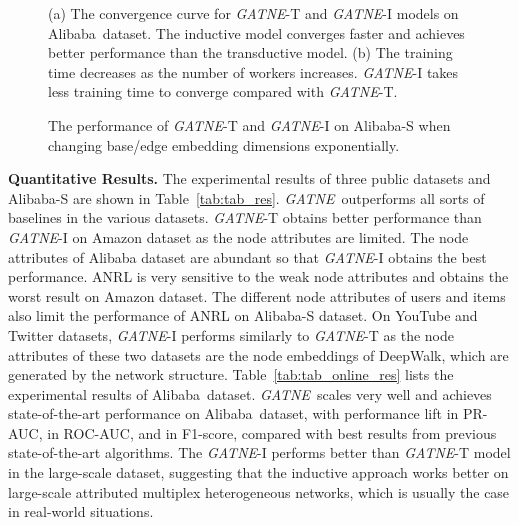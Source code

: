 \documentclass[sigconf]{acmart}
\newcommand{\company}{Alibaba}
\newcommand{\model}{{\em GATNE}}
\newcommand{\hide}[1]{} \newcommand{\jie}[1]{\textbf{\color{red}[(JT: #1 )]}}  \newcommand{\vpara}[1]{\vspace{0.07in}\noindent\textbf{#1 }}
\begin{document}
\begin{figure}
    \setlength{\belowcaptionskip}{-0.1cm}
	\centering
	\caption{(a) The convergence curve for  \model-T and \model-I models on \company\ dataset. The inductive model converges faster and achieves better performance than the transductive model. \hide{The batch size is set to 512.} (b) The training time decreases as the number of workers increases. \model-I takes less training time to converge compared with \model-T.}
\end{figure}

\begin{figure}[t]
\centering
	\caption{The performance of \model-T and \model-I on \company-S when changing base/edge embedding dimensions exponentially.}
	\label{fig:parameter}
\end{figure}

\vpara{Quantitative Results.}
The experimental results of three public datasets and \company-S are shown in Table~\ref{tab:tab_res}. \model\ outperforms all sorts of baselines in the various datasets. 
\model-T obtains better performance than \model-I on Amazon dataset as the node attributes are limited. The node attributes of Alibaba dataset are abundant so that \model-I obtains the best performance. ANRL is very sensitive to the weak node attributes and obtains the worst result on Amazon dataset. The different node attributes of users and items also limit the performance of ANRL on Alibaba-S dataset. On YouTube and Twitter datasets, \model-I performs similarly to \model-T as the node attributes of these two datasets are the node embeddings of DeepWalk, which are generated by the network structure.
Table~\ref{tab:tab_online_res} lists the experimental results of \company\ dataset.  \model\ scales very well and achieves state-of-the-art performance on \company\  dataset, with  performance lift in PR-AUC,  in ROC-AUC, and  in F1-score, compared with best results from previous state-of-the-art algorithms. The \model-I performs better than \model-T model in the large-scale dataset, suggesting that the inductive approach works better on large-scale attributed multiplex heterogeneous networks, which is usually the case in real-world situations.
\end{document}
